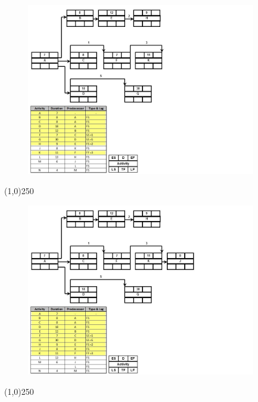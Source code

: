 \begin{frame}
\begin{figure}
	\centering
		\includegraphics[width = 10.0cm]{oldnotes/Slide196.jpg}
\end{figure}
\end{frame}
\begin{center}\line(1,0){250}\end{center}




\begin{frame}
\begin{figure}
	\centering
		\includegraphics[width = 10.0cm]{oldnotes/Slide197.jpg}
\end{figure}
\end{frame}
\begin{center}\line(1,0){250}\end{center}




